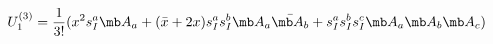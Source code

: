 \begin{equation}
U_{1}^{(3)}=\frac{1}{3!}(x^{2} s_{I}^{a}{\mb A}_{a}+(\bar{x}+2x)s_{I}^{a}s_{I}^{b}{\mb A}_{a}\bar{{\mb A}_{b}}+s_{I}^{a}s_{I}^{b}s_{I}^{c}{\mb A}_{a}{\mb A}_{b}{\mb A}_{c})
\end{equation}

